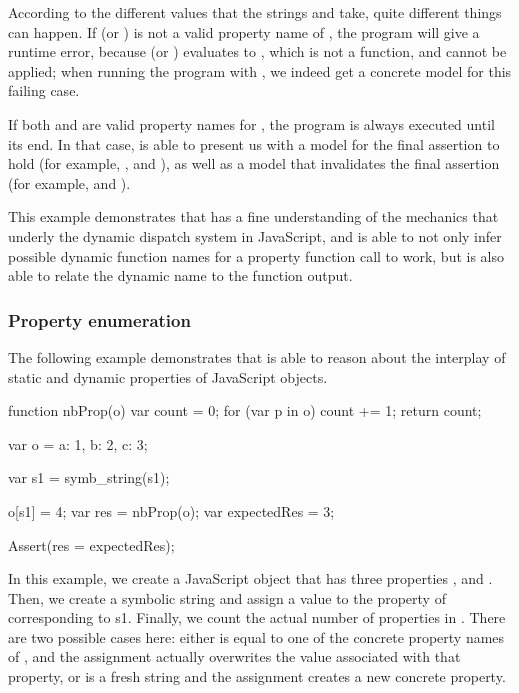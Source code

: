 According to the different values that the strings  and  take, quite different things can happen.
If  (or ) is not a valid property name of , the program will give a runtime error, because  (or ) evaluates to , which is not a function, and cannot be applied; when running the program with \cosette, we indeed get a concrete model for this failing case.

If both  and  are valid property names for , the program is always executed until its end.
In that case, \cosette is able to present us with a model for the final assertion to hold (for example, , and ), as well as a model that invalidates the final assertion (for example,  and ).

This example demonstrates that \cosette has a fine understanding of the mechanics that underly the dynamic dispatch system in JavaScript, and is able to not only infer possible dynamic function names for a property function call to work, but is also able to relate the dynamic name to the function output.


\subsubsection{Property enumeration}
The following example demonstrates that \cosette is able to reason about the interplay of static and dynamic properties of JavaScript objects.

\begin{lstjs}

function nbProp(o) {
  var count = 0;
  for (var p in o) {
    count += 1;
  }
  return count;
}

var o = {a: 1, b: 2, c: 3};

var s1 = symb_string(s1);

o[s1] = 4;
var res = nbProp(o);
var expectedRes = 3;

Assert(res = expectedRes);
\end{lstjs}

In this example, we create a JavaScript object  that has three properties , and .
Then, we create a symbolic string  and assign a value to the property of  corresponding to {s1}.
Finally, we count the actual number of properties in .
There are two possible cases here: either  is equal to one of the concrete property names of , and the assignment actually overwrites the value associated with that property, or  is a fresh string and the assignment creates a new concrete property.


